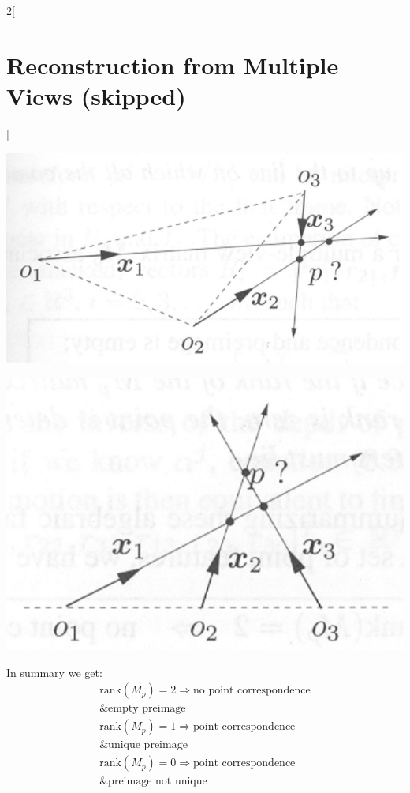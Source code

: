 \documentclass[oneside,fontsize=11pt,paper=a4]{scrartcl}
\newenvironment{myfigure}
  {\par\medskip\noindent\minipage{\linewidth}}
  {\endminipage\par\medskip}
\begin{document}
\begin{multicols}{2}[\section{Reconstruction from Multiple Views (skipped)}]
\begin{myfigure}
 \centering
 \includegraphics[width=0.9\linewidth]{Images/Degeneracy_trifocal_plane.jpg}
\end{myfigure}

\begin{myfigure}
 \centering
 \includegraphics[width=0.9\linewidth]{Images/Degeneracy_rectlinear_motion.jpg}
\end{myfigure}

In summary we get:
\begin{equation*}
\begin{split}
    \text{rank}(M_p) = 2 \Rightarrow \text{no point correspondence} \\ \text{\& empty preimage} \\
    \text{rank}(M_p) = 1 \Rightarrow \text{point correspondence} \\ \text{\& unique preimage} \\
    \text{rank}(M_p) = 0 \Rightarrow \text{point correspondence} \\ \text{\& preimage not unique}
\end{split}
\end{equation*}


\end{multicols}
\end{document}
